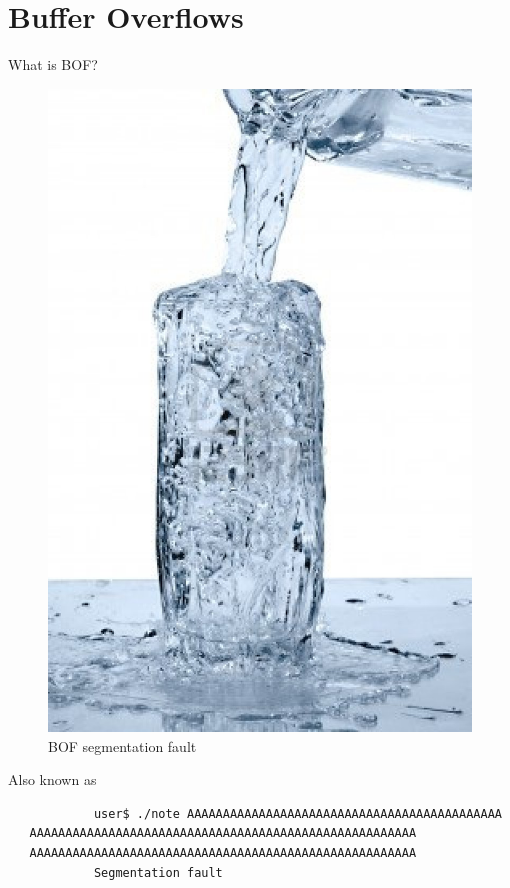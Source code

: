\section{Buffer Overflows}

\begin{frame}{What is BOF?}
	\begin{figure}
		\centering
		\includegraphics[height=.7\textheight]{imgs/segfault.png}
		\caption{BOF segmentation fault}
		\label{fig:segfault}
	\end{figure}
	\begin{block}{Also known as}
		\begin{verbatim}
			user$ ./note AAAAAAAAAAAAAAAAAAAAAAAAAAAAAAAAAAAAAAAAAAAA
   AAAAAAAAAAAAAAAAAAAAAAAAAAAAAAAAAAAAAAAAAAAAAAAAAAAAAA
   AAAAAAAAAAAAAAAAAAAAAAAAAAAAAAAAAAAAAAAAAAAAAAAAAAAAAA
			Segmentation fault
		\end{verbatim}
	\end{block}
\end{frame}
